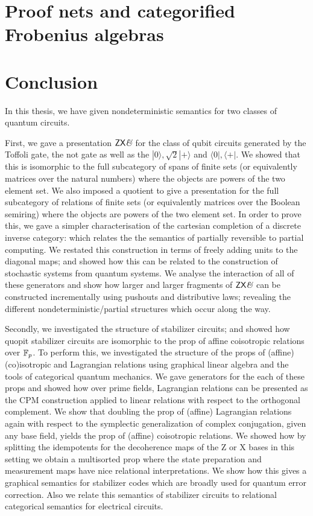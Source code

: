 \documentclass[12pt]{ociamthesis}  %
\begin{document}
\chapter{Proof nets and categorified Frobenius algebras}
\label{chap:grothendieck}


\chapter{Conclusion}
\label{chap:conclusion}


In this thesis, we have given nondeterministic semantics for two classes of quantum circuits.  


First, we gave a presentation $\mathsf{ZX}\textit{\&}$ for the  class of qubit circuits generated by the Toffoli gate, the not gate as well as the $|0\rangle, \sqrt 2 |+\rangle$ and $\langle 0 |, \langle +|$.  We showed that this is isomorphic to the full subcategory of spans of finite sets (or equivalently matrices over the natural numbers) where the objects are powers of the two element set.  We also imposed a quotient to give a presentation for the full subcategory of relations of finite sets (or equivalently matrices over the Boolean semiring) where the objects are powers of the two element set.  In order to prove this, we gave a simpler characterisation of the cartesian completion of a discrete inverse category: which relates the the semantics of partially reversible to partial computing.  We restated this construction in terms of freely adding units to the diagonal maps; and showed how this can be related to the construction of stochastic systems from quantum systems.  We analyse the interaction of all of these generators and show how larger and larger fragments of $\mathsf{ZX}\textit{\&}$ can be constructed incrementally using pushouts and distributive laws; revealing the different nondeterministic/partial structures which occur along the way.


Secondly, we investigated the structure of stabilizer circuits; and showed how quopit stabilizer circuits are isomorphic to the prop of affine coisotropic relations over $\mathbb{F}_p$.  To perform this, we investigated the structure of the props of (affine) (co)isotropic and Lagrangian relations using graphical linear algebra and the tools of categorical quantum mechanics.  We gave generators for the each of these props and showed how over prime fields, Lagrangian relations can be presented as the CPM construction applied to linear relations with respect to the orthogonal complement.  We show that doubling the prop of (affine) Lagrangian relations again with respect to the symplectic generalization of complex conjugation, given any base field, yields the prop of (affine) coisotropic relations.  We showed how by splitting the idempotents for the decoherence maps of the Z or X bases in this setting we obtain a multisorted prop where the state preparation and measurement maps have nice relational interpretations.  We show how this gives a graphical semantics for stabilizer codes which are broadly used for quantum error correction.  Also we relate this semantics of stabilizer circuits to relational categorical semantics for electrical circuits.
\end{document}
